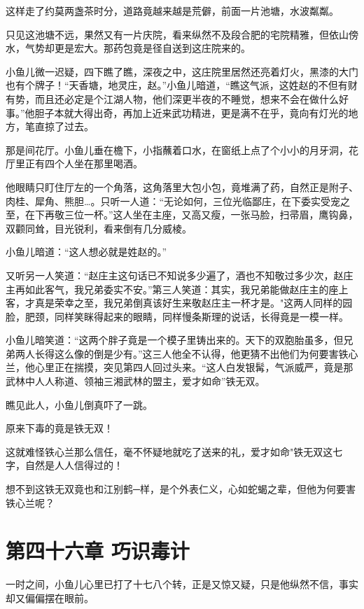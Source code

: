 \documentclass[12pt,oneside]{book}
\begin{document}
这样走了约莫两盏茶时分，道路竟越来越是荒僻，前面一片池塘，水波粼粼。

只见这池塘不远，果然又有一片庆院，看来纵然不及段合肥的宅院精雅，但依山傍水，气势却更是宏大。那药包竟是径自送到这庄院来的。

小鱼儿微一迟疑，四下瞧了瞧，深夜之中，这庄院里居然还亮着灯火，黑漆的大门也有个牌子！``天香塘，地灵庄，赵。''小鱼儿暗道，``瞧这气派，这姓赵的不但有财有势，而且还必定是个江湖人物，他们深更半夜的不睡觉，想来不会在做什么好事。''他胆子本就大得出奇，再加上近来武功精进，更是满不在乎，竟向有灯光的地方，笔直掠了过去。

那是间花厅。小鱼儿垂在檐下，小指蘸着口水，在窗纸上点了个小小的月牙洞，花厅里正有四个人坐在那里喝酒。

他眼睛只盯住厅左的一个角落，这角落里大包小包，竟堆满了药，自然正是附子、肉桂、犀角、熊胆\ldots。只听一人道：``无论如何，三位光临鄙庄，在下委实受宠之至，在下再敬三位一杯。''这人坐在主座，又高又瘦，一张马脸，扫帚眉，鹰钩鼻，双颧同耸，目光锐利，看来倒有几分威棱。

小鱼儿暗道：``这人想必就是姓赵的。''

又听另一人笑道：``赵庄主这句话已不知说多少遍了，酒也不知敬过多少次，赵庄主再如此客气，我兄弟委实不安。''第三人笑道：其实，我兄弟能做赵庄主的座上客，才真是荣幸之至，我兄弟倒真该好生来敬赵庄主一杯才是。"这两人同样的园脸，肥颈，同样笑眯得起来的眼睛，同样慢条斯理的说话，长得竟是一模一样。

小鱼儿暗笑道：``这两个胖子竟是一个模子里铸出来的。天下的双胞胎虽多，但兄弟两人长得这么像的倒是少有。''这三人他全不认得，他更猜不出他们为何要害铁心兰，他心里正在揣摸，突见第四人回过头来。``这人白发银髯，气派威严，竟是那武林中人人称道、领袖三湘武林的盟主，爱才如命''铁无双。

瞧见此人，小鱼儿倒真吓了一跳。

原来下毒的竟是铁无双！

这就难怪铁心兰那么信任，毫不怀疑地就吃了送来的礼，爱才如命"铁无双这七字，自然是人人信得过的！

想不到这铁无双竟也和江别鹤─样，是个外表仁义，心如蛇蝎之辈，但他为何要害铁心兰呢？

\hypertarget{ux7b2cux56dbux5341ux516dux7ae0-ux5de7ux8bc6ux6bd2ux8ba1}{%
\chapter{第四十六章
巧识毒计}\label{ux7b2cux56dbux5341ux516dux7ae0-ux5de7ux8bc6ux6bd2ux8ba1}}

一时之间，小鱼儿心里已打了十七八个转，正是又惊又疑，只是他纵然不信，事实却又偏偏摆在眼前。
\end{document}
